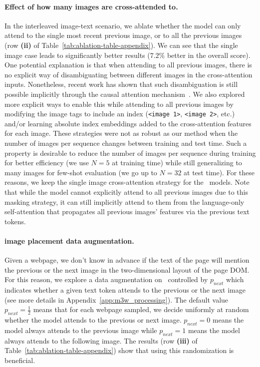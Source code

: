 \paragraph{Effect of how many images are cross-attended to.}
In the interleaved image-text scenario, we ablate whether the model can only attend to the single most recent previous image, or to all the previous images (row \textbf{(ii)} of Table~\ref{tab:ablation-table-appendix}).
We can see that the single image case leads to significantly better results ($7.2\%$ better in the overall score).
One potential explanation is that when attending to all previous images, there is no explicit way of disambiguating between different images in the cross-attention inputs.
Nonetheless, recent work has shown that such disambiguation is still possible implicitly through the causal attention mechanism~\citep{haviv2022transformer}.
We also explored more explicit ways to enable this while attending to all previous images by modifying the image tags to include an index (\texttt{<image 1>}, \texttt{<image 2>}, etc.) and/or learning absolute index embeddings added to the cross-attention features for each image.
These strategies were not as robust as our method when the number of images per sequence changes between training and test time.
Such a property is desirable to reduce the number of images per sequence during training for better efficiency (we use $N=5$ at training time) while still generalizing to many images for few-shot evaluation (we go up to $N=32$ at test time).
For these reasons, we keep the single image cross-attention strategy for the~\method{} models.
Note that while the model cannot explicitly attend to all previous images due to this masking strategy, it can still implicitly attend to them from the language-only self-attention that propagates all previous images' features via the previous text tokens.


\paragraph{\mmmw{} image placement data augmentation.}
Given a webpage, we don't know in advance if the text of the page will mention the previous or the next image in the two-dimensional layout of the page DOM.
For this reason, we explore a data augmentation on~\mmmw{} controlled by $p_{next}$ which indicates whether a given text token attends to the previous or the next image (see more details in Appendix~\ref{app:m3w_processing}).
The default value $p_{next} = \tfrac{1}{2}$ means that for each webpage sampled, we decide uniformly at random whether the model attends to the previous or next image.
$p_{next} = 0$ means the model always attends to the previous image while $p_{next} = 1$ means the model always attends to the following image.
The results (row \textbf{(iii)} of Table~\ref{tab:ablation-table-appendix}) show that using this randomization is beneficial.


